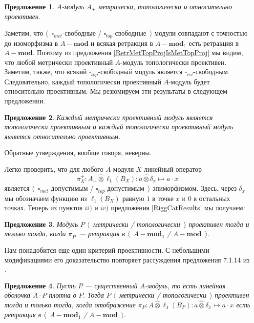 \documentclass[12pt]{article}
\numberwithin{equation}{subsection}
\theoremstyle{plain}
\newtheorem{proposition}{Предложение}
\newcommand{\projtens}{\mathbin{\widehat{\otimes}}}
\begin{document}
\begin{fulltext}
\begin{proposition}\label{UnitalAlgIsMetTopProj} $A$-модуль $A_+$ метрически, топологически и  относительно проективен.
\end{proposition} 

Заметим, что $\langle$~$\square_{met}$-свободные / $\square_{top}$-свободные~$\rangle$ модули совпадают с точностью до изоморфизма в $A-\mathbf{mod}$ и всякая ретракция в $A-\mathbf{mod}_1$ есть ретракция в $A-\mathbf{mod}$. Поэтому из предложения \ref{RetrMetTopProjIsMetTopProj} мы видим, что любой метрически проективный $A$-модуль топологически проективен. Заметим, также, что всякий $\square_{top}$-свободный модуль является $\square_{rel}$-свободным. Следовательно, каждый топологически проективный $A$-модуль будет относительно проективным. Мы резюмируем эти результаты в следующем предложении.

\begin{proposition}\label{MetProjIsTopProjAndTopProjIsRelProj} Каждый метрически проективный модуль является топологически проективным и каждый топологически проективный модуль является относительно проективным.
\end{proposition}

Обратные утверждения, вообще говоря, неверны.


Легко проверить, что для любого $A$-модуля $X$ линейный оператор
$$
\pi_X^+:A_+\projtens \ell_1(B_X):a\projtens \delta_x\mapsto a\cdot x
$$
является $\langle$~$\square_{met}$-допустимым / $\square_{top}$-допустимым~$\rangle$ эпиморфизмом. Здесь, через $\delta_x$ мы обозначаем функцию из $\ell_1(B_X)$ равную $1$ в точке $x$ и $0$ в остальных точках. Теперь из пунктов $ii)$ и $iv)$ предложения \ref{RiggCatResults} мы получаем:

\begin{proposition}\label{MetTopProjModViaCanonicMorph}
Модуль $P$ $\langle$~метрически / топологически~$\rangle$ проективен тогда и только тогда, когда  $\pi_P^+$ --- ретракция в $\langle$~$A-\mathbf{mod}_1$ / $A-\mathbf{mod}$~$\rangle$.
\end{proposition}

Нам понадобится еще один критерий проективности. С небольшими модификациями его доказательство повторяет рассуждения предложения 7.1.14 из \cite{HelBanLocConvAlg}.

\begin{proposition}\label{NonDegenMetTopProjCharac} Пусть $P$ --- существенный $A$-модуль, то есть линейная оболочка $A\cdot P$ плотна в $P$. Тогда $P$ $\langle$~метрически / топологически~$\rangle$ проективен тогда и только тогда, когда отображение $\pi_P:A\projtens\ell_1(B_P):a\projtens\delta_x\mapsto a\cdot x$ есть ретракция в $\langle$~$A-\mathbf{mod}_1$ / $A-\mathbf{mod}$~$\rangle$.
\end{proposition} 


\end{fulltext}
\end{document}
